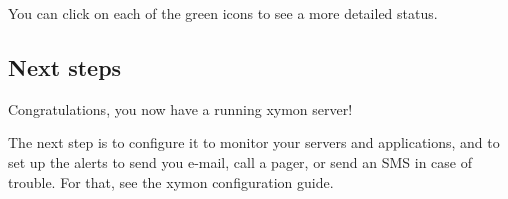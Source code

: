  You can click on each of the green icons to see a more detailed status.
\subsection{Next steps}


 Congratulations, you now have a running xymon server!


 The next step is to configure it to monitor your servers and
 applications, and to set up the alerts to send you e-mail, call a
 pager, or send an SMS in case of trouble. For that, see the xymon
 configuration guide.





